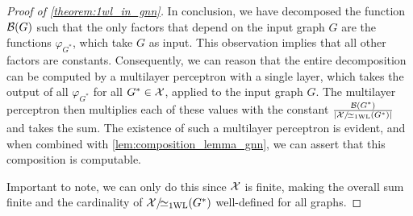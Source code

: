 \begin{proof}[Proof of \cref*{theorem:1wl_in_gnn}]
    In conclusion, we have decomposed the \gnn function $\mathcal{B}(G)$ such that the only factors that depend on the input graph $G$ are the functions $\varphi_{G^*}$, which take $G$ as input. This observation implies that all other factors are constants. Consequently, we can reason that the entire decomposition can be computed by a multilayer perceptron with a single layer, which takes the output of all $\varphi_{G^*}$ for all $G^* \in \mathcal{X}$, applied to the input graph $G$. The multilayer perceptron then multiplies each of these values with the constant $\frac{\mathcal{B}(G^*)}{|\mathcal{X}/\!{\simeq_{\text{1WL}}}(G^*)|}$ and takes the sum. The existence of such a multilayer perceptron is evident, and when combined with \cref{lem:composition_lemma_gnn}, we can assert that this composition is \gnn computable.

    Important to note, we can only do this since $\mathcal{X}$ is finite, making the overall sum finite and the cardinality of $\mathcal{X}/\!{\simeq_{\text{1WL}}}(G^*)$ well-defined for all graphs.
\end{proof}